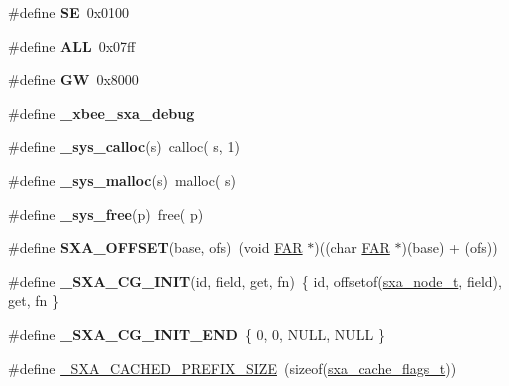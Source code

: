 \begin{DoxyCompactItemize}
\mbox{\label{group___s_x_a_ga18bbe716f5be6adbd2150139244c0262}} 
\#define {\bfseries SE}~0x0100
\item 
\mbox{\label{group___s_x_a_ga1edd1ea8bddaf4d9c5eb3eae1ee1726a}} 
\#define {\bfseries A\+LL}~0x07ff
\item 
\mbox{\label{group___s_x_a_gaac44b4153048abba18e0e606de4e42bc}} 
\#define {\bfseries GW}~0x8000
\item 
\mbox{\label{group___s_x_a_gade008fe82b5455e08af1525adb4fd2ae}} 
\#define {\bfseries \+\_\+xbee\+\_\+sxa\+\_\+debug}
\item 
\mbox{\label{group___s_x_a_ga5d892efb368534a238af99c167fcf490}} 
\#define {\bfseries \+\_\+sys\+\_\+calloc}(s)~calloc( s, 1)
\item 
\mbox{\label{group___s_x_a_ga90f66b432e3d4f1df7742dd79c3bffbc}} 
\#define {\bfseries \+\_\+sys\+\_\+malloc}(s)~malloc( s)
\item 
\mbox{\label{group___s_x_a_ga61f8debfdf54fdac92d3ad1754e8afe5}} 
\#define {\bfseries \+\_\+sys\+\_\+free}(p)~free( p)
\item 
\mbox{\label{group___s_x_a_ga8f17956f64da8e8d2302ce13991f41b9}} 
\#define {\bfseries S\+X\+A\+\_\+\+O\+F\+F\+S\+ET}(base,  ofs)~(void \hyperlink{group__hal_gaef060b3456fdcc093a7210a762d5f2ed}{F\+AR} $\ast$)((char \hyperlink{group__hal_gaef060b3456fdcc093a7210a762d5f2ed}{F\+AR} $\ast$)(base) + (ofs))
\item 
\mbox{\label{group___s_x_a_gab234f96bee6d9d1493d29872a2d48110}} 
\#define {\bfseries \+\_\+\+S\+X\+A\+\_\+\+C\+G\+\_\+\+I\+N\+IT}(id,  field,  get,  fn)~\{ id, offsetof(\hyperlink{structsxa__node__t}{sxa\+\_\+node\+\_\+t}, field), get, fn \}
\item 
\mbox{\label{group___s_x_a_ga77fd70a084eb4c9fcb54902d1237c40a}} 
\#define {\bfseries \+\_\+\+S\+X\+A\+\_\+\+C\+G\+\_\+\+I\+N\+I\+T\+\_\+\+E\+ND}~\{ 0, 0, N\+U\+LL, N\+U\+LL \}
\item 
\#define \hyperlink{group___s_x_a_ga0deca0e430c1eeb8d4719574d1331900}{\+\_\+\+S\+X\+A\+\_\+\+C\+A\+C\+H\+E\+D\+\_\+\+P\+R\+E\+F\+I\+X\+\_\+\+S\+I\+ZE}~(sizeof(\hyperlink{group___s_x_a_ga21b45e50d83fcc1363c4239313e88c06}{sxa\+\_\+cache\+\_\+flags\+\_\+t}))

\end{DoxyCompactItemize}
